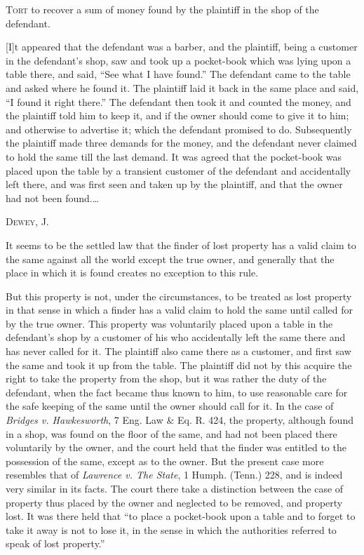 
\textsc{Tort} to recover a sum of money found by the plaintiff in the shop of
the
defendant.

[I]t appeared that the defendant was a barber, and the plaintiff, being a
customer in the defendant's shop, saw and took up a pocket-book which was lying
upon a table there, and said, ``See what I have found.'' The defendant came to
the table and asked where he found it. The plaintiff laid it back in the same
place and said, ``I found it right there.'' The defendant then took it and
counted the money, and the plaintiff told him to keep it, and if the owner
should come to give it to him; and otherwise to advertise it; which the
defendant promised to do. Subsequently the plaintiff made three demands for the
money, and the defendant never claimed to hold the same till the last demand.
It was agreed that the pocket-book was placed upon the table by a transient
customer of the defendant and accidentally left there, and was first seen and
taken up by the plaintiff, and that the owner had not been found.\ldots

\opinion \textsc{Dewey}, J.

It seems to be the settled law that the finder of lost property has a valid
claim to the same against all the world except the true owner, and generally
that the place in which it is found creates no exception to this rule.

But this property is not, under the circumstances, to be treated as lost
property in that sense in which a finder has a valid claim to hold the same
until called for by the true owner. This property was voluntarily placed upon a
table in the defendant's shop by a customer of his who accidentally left the
same there and has never called for it. The plaintiff also came there as a
customer, and first saw the same and took it up from the table. The plaintiff
did not by this acquire the right to
take %
the property from the shop, but it
was rather the duty of the defendant, when the fact became thus known to him,
to use reasonable care for the safe keeping of the same until the owner should
call for it. In the case of \textit{Bridges v. Hawkesworth}, 7 Eng. Law \& Eq.
R. 424, the property, although found in a shop, was found on the floor of the
same, and had not been placed there voluntarily by the owner, and the court
held that the finder was entitled to the possession of the same, except as to
the owner. But the present case more resembles that of \textit{Lawrence v. The
State}, 1 Humph. (Tenn.) 228, and is indeed very similar in its facts. The
court there take a distinction between the case of property thus placed by the
owner and neglected to be removed, and property lost. It was there held that
``to place a pocket-book upon a table and to forget to take it away is not to
lose it, in the sense in which the authorities referred to speak of lost
property.''

